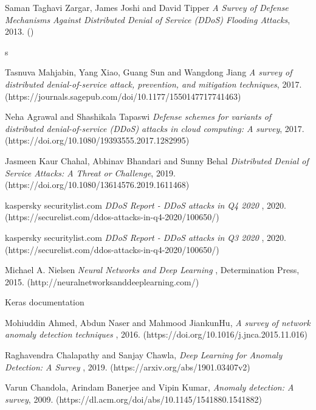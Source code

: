 \begin{thebibliography}{9}
     Saman Taghavi Zargar, James Joshi and David Tipper {\em A Survey of Defense Mechanisms Against Distributed Denial of Service (DDoS) Flooding Attacks}, 2013. ()

     s

     Tasnuva Mahjabin, Yang Xiao, Guang Sun and Wangdong Jiang {\em A survey of distributed denial-of-service attack, prevention, and mitigation techniques}, 2017. (https://journals.sagepub.com/doi/10.1177/1550147717741463)

     Neha Agrawal and Shashikala Tapaswi {\em Defense schemes for variants of distributed denial-of-service (DDoS) attacks in cloud
    computing: A survey}, 2017. (https://doi.org/10.1080/19393555.2017.1282995)

     Jasmeen Kaur Chahal, Abhinav Bhandari and Sunny Behal {\em Distributed Denial of Service Attacks: A Threat or Challenge}, 2019. (https://doi.org/10.1080/13614576.2019.1611468)

     kaspersky securitylist.com {\em DDoS Report - DDoS attacks in Q4 2020
    }, 2020. (https://securelist.com/ddos-attacks-in-q4-2020/100650/)
  
     kaspersky securitylist.com {\em DDoS Report - DDoS attacks in Q3 2020
    }, 2020. (https://securelist.com/ddos-attacks-in-q4-2020/100650/)    

     Michael A. Nielsen  {\em Neural Networks and Deep Learning }, Determination Press, 2015. (http://neuralnetworksanddeeplearning.com/)   

      Keras documentation 
    
      Mohiuddin Ahmed, Abdun Naser and Mahmood JiankunHu, {\em A survey of network anomaly detection techniques }, 2016. (https://doi.org/10.1016/j.jnca.2015.11.016)

     Raghavendra Chalapathy and  Sanjay Chawla, {\em Deep Learning for Anomaly Detection: A Survey }, 2019. (https://arxiv.org/abs/1901.03407v2)
    
     Varun Chandola, Arindam Banerjee and Vipin Kumar, {\em Anomaly detection: A survey}, 2009. (https://dl.acm.org/doi/abs/10.1145/1541880.1541882)
    

\end{thebibliography}
